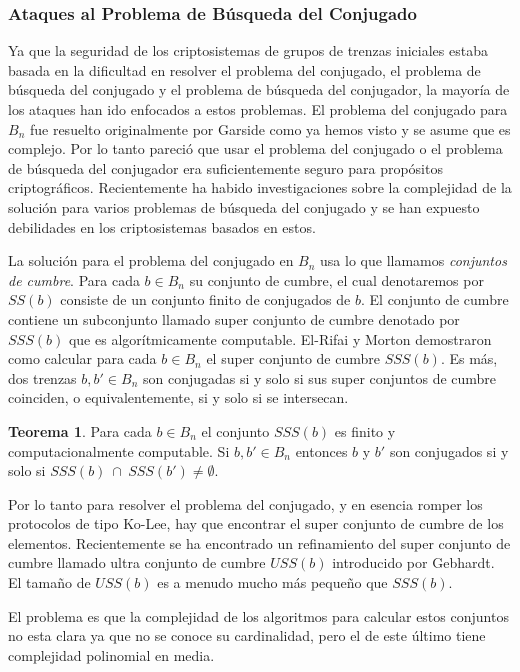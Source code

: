 \documentclass[12pt]{article}
\theoremstyle{definition}
\newtheorem{teor}{Teorema}[section]
\begin{document}
\subsubsection{Ataques al Problema de Búsqueda del Conjugado}

Ya que la seguridad de los criptosistemas de grupos de trenzas iniciales estaba basada en la dificultad en resolver el problema del conjugado, el problema de búsqueda del conjugado y el problema de búsqueda del conjugador, la mayoría de los ataques han ido enfocados a estos problemas. El problema del conjugado para $B_n$ fue resuelto originalmente por Garside como ya hemos visto y se asume que es complejo. Por lo tanto pareció que usar el problema del conjugado o el problema de búsqueda del conjugador era suficientemente seguro para propósitos criptográficos. Recientemente ha habido investigaciones sobre la complejidad de la solución para varios problemas de búsqueda del conjugado y se han expuesto debilidades en los criptosistemas basados en estos.

La solución para el problema del conjugado en $B_n$ usa lo que llamamos \textit{conjuntos de cumbre}. Para cada $b\in B_n$ su conjunto de cumbre, el cual denotaremos por $SS(b)$ consiste de un conjunto finito de conjugados de $b$. El conjunto de cumbre contiene un subconjunto llamado super conjunto de cumbre denotado por $SSS(b)$ que es algorítmicamente computable. El-Rifai y Morton demostraron como calcular para cada $b\in B_n$ el super conjunto de cumbre $SSS(b)$. Es más, dos trenzas $b,b'\in B_n$ son conjugadas si y solo si sus super conjuntos de cumbre coinciden, o equivalentemente, si y solo si se intersecan.

\begin{teor}
Para cada $b\in B_n$ el conjunto $SSS(b)$ es finito y computacionalmente computable. Si $b,b'\in B_n$ entonces $b$ y $b'$ son conjugados si y solo si $SSS(b)\ \cap\ SSS(b')\neq \emptyset$.
\end{teor}

Por lo tanto para resolver el problema del conjugado, y en esencia romper los protocolos de tipo Ko-Lee, hay que encontrar el super conjunto de cumbre de los elementos. Recientemente se ha encontrado un refinamiento del super conjunto de cumbre llamado ultra conjunto de cumbre $USS(b)$ introducido por Gebhardt. El tamaño de $USS(b)$ es a menudo mucho más pequeño que $SSS(b)$.

El problema es que la complejidad de los algoritmos para calcular estos conjuntos no esta clara ya que no se conoce su cardinalidad, pero el de este último tiene complejidad polinomial en media.
\end{document}
